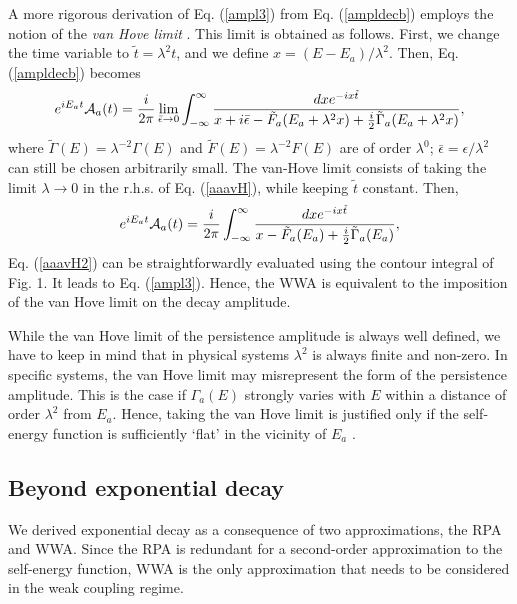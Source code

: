 \documentclass[12pt]{article}
\numberwithin{equation}{section}
\begin{document}
A more rigorous derivation of Eq. (\ref{ampl3}) from Eq. (\ref{ampldecb}) employs the notion of the  {\em van Hove limit} \cite{vanHo}.  This limit is obtained as follows. First, we change the time variable to $\tilde{t} = \lambda^2 t$, and we define $x = (E-E_a)/\lambda^2$. Then, Eq. (\ref{ampldecb}) becomes
\begin{eqnarray}
e^{iE_at} {\cal A}_a(t) =  \frac{i}{2 \pi  } \lim_{\bar{\epsilon} \rightarrow 0} \int_{-\infty }^{\infty } \frac{dx e^{-ix \tilde{t}}}{x + i \bar{\epsilon}-  \tilde{F}_a(E_a+\lambda^2x ) + \frac{i}{2} \tilde{\Gamma}_a(E_a+\lambda^2x)}, \label{aaavH}
\end{eqnarray}
where $\tilde{\Gamma} (E) = \lambda^{-2}\Gamma(E)$ and $\tilde{F} (E) = \lambda^{-2}F (E)$ are of order $\lambda^0$; $\bar{\epsilon} = \epsilon/\lambda^2$ can still be chosen arbitrarily small. The van-Hove limit consists of taking the limit $\lambda \rightarrow 0$ in the r.h.s. of Eq. (\ref{aaavH}), while keeping $\tilde{t}$ constant. Then,
\begin{eqnarray}
e^{iE_at} {\cal A}_a(t) =  \frac{i}{2 \pi  }  \int_{-\infty }^{\infty } \frac{dx e^{-ix \tilde{t}}}{x   - \tilde{F}_a(E_a) + \frac{i}{2} \tilde{\Gamma}_a(E_a)}, \label{aaavH2}
\end{eqnarray}
Eq. (\ref{aaavH2}) can be straightforwardly evaluated using the contour integral of Fig. 1. It leads to  Eq. (\ref{ampl3}). Hence, the WWA  is equivalent to the imposition of the van Hove limit on the decay amplitude.

While the van Hove limit of the persistence amplitude is always well defined, we have to keep in mind that in physical systems $\lambda^2$ is always finite and non-zero. In specific systems, the van Hove limit may misrepresent the form of the persistence amplitude. This is the case if $\Gamma_a(E)$ strongly varies with $E$ within a distance of order $\lambda^2$ from $E_a$.  Hence, taking the van Hove limit is justified only if the self-energy function is sufficiently `flat' in the vicinity of $E_a$ \cite{BaRa}.





\subsection{Beyond   exponential decay }
We derived  exponential decay as a consequence of two approximations, the RPA and WWA. Since the RPA is redundant for a second-order approximation to the self-energy function,  WWA is the only approximation that needs to be considered in the weak coupling regime.
\end{document}
